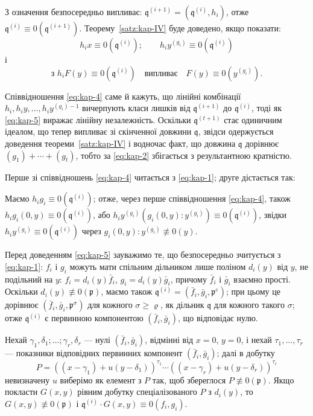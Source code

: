 \documentclass[11pt]{article}
\theoremstyle{plain}
\begin{document}
З означення безпосередньо випливає:
$\mathfrak{q}^{(i+1)} = (\mathfrak{q}^{(i)}, h_{i})$, отже
$\mathfrak{q}^{(i)} \equiv 0(\mathfrak{q}^{(i+1)})$.
Теорему~\ref{satz:kap-IV} буде доведено, якщо показати:
\begin{equation}\label{eq:kap-4}
h_{i}x \equiv 0(\mathfrak{q}^{(i)}); \qquad
h_{i}y^{(g_{i})} \equiv 0(\mathfrak{q}^{(i)})
\end{equation}
і
\begin{equation}\label{eq:kap-5}
\text{з } h_{i}F(y) \equiv 0(\mathfrak{q}^{(i)})
\quad\text{випливає}\quad F(y) \equiv 0(y^{(g_{i})}).
\end{equation}

Співвідношення \eqref{eq:kap-4} саме й кажуть, що лінійні комбінації
$h_{i}, h_{i}y, \ldots, h_{i}y^{(g_{i})-1}$ вичерпують класи лишків
від $\mathfrak{q}^{(i+1)}$ до $\mathfrak{q}^{(i)}$, тоді як
\eqref{eq:kap-5} виражає лінійну незалежність. Оскільки
$\mathfrak{q}^{(t+1)}$ стає одиничним ідеалом, що тепер випливає зі
скінченної довжини $\mathfrak{q}$, звідси одержується доведення
теореми~\ref{satz:kap-IV} і водночас факт, що довжина
$\mathfrak{q}$ дорівнює $(g_{1}) + \cdots + (g_{t})$, тобто за
\eqref{eq:kap-2} збігається з результантною кратністю.

Перше зі співвідношень \eqref{eq:kap-4} читається з
\eqref{eq:kap-1}; друге дістається так:

Маємо $h_{i}g_{i} \equiv 0(\mathfrak{q}^{(i)})$; отже, через перше
співвідношення \eqref{eq:kap-4}, також
$h_{i}g_{i}(0,y) \equiv 0(\mathfrak{q}^{(i)})$, або
$h_{i}y^{(g_{i})}(g_{i}(0,y):y^{(g_{i})})
\equiv 0(\mathfrak{q}^{(i)})$, звідки
$h_{i}y^{(g_{i})} \equiv 0(\mathfrak{q}^{(i)})$ через
$g_{i}(0,y):y^{(g_{i})} \not\equiv 0(y)$.

Перед доведенням \eqref{eq:kap-5} зауважимо те, що безпосередньо
зчитується з \eqref{eq:kap-1}: $f_{i}$ і $g_{i}$ можуть мати
спільним дільником лише поліном $d_{i}(y)$ від $y$, не подільний на
$y$: $f_{i} = d_{i}(y)\bar{f}_{i}$,
$g_{i} = d_{i}(y)\bar{g}_{i}$, причому $\bar{f}_{i}$ і
$\bar{g}_{i}$ взаємно прості. Оскільки
$d_{i}(y) \not\equiv 0(\mathfrak{p})$, маємо також
$\mathfrak{q}^{(i)} = (\bar{f}_{i}, \bar{g}_{i}, \mathfrak{p}^{e})$;
при цьому це дорівнює
$(\bar{f}_{i}, \bar{g}_{i}, \mathfrak{p}^{\sigma})$ для кожного
$\sigma \geq \varrho$, як дільник $\mathfrak{q}$ для кожного такого
$\sigma$; отже $\mathfrak{q}^{(i)}$ є первинною компонентою
$(\bar{f}_{i}, \bar{g}_{i})$, що відповідає нулю.

Нехай $\gamma_{1}, \delta_{1}; \ldots; \gamma_{r}, \delta_{r}$ ---
нулі $(\bar{f}_{i}, \bar{g}_{i})$, відмінні від $x = 0$, $y = 0$, і
нехай $\tau_{1}, \ldots, \tau_{r}$ --- показники відповідних
первинних компонент $(\bar{f}_{i}, \bar{g}_{i})$; далі в добутку
\[
P = ((x-\gamma_{1}) + u(y-\delta_{1}))^{\tau_{1}} \cdots
((x-\gamma_{r}) + u(y-\delta_{r}))^{\tau_{r}}
\]
невизначену $u$ виберімо як елемент з $P$ так, щоб збереглося
$P \not\equiv 0(\mathfrak{p})$. Якщо покласти $G(x,y)$ рівним
добутку спеціалізованого $P$ з $d_{i}(y)$, то
$G(x,y) \not\equiv 0(\mathfrak{p})$ і
$\mathfrak{q}^{(i)} \cdot G(x,y) \equiv 0(f_{i}, g_{i})$.
\end{document}
